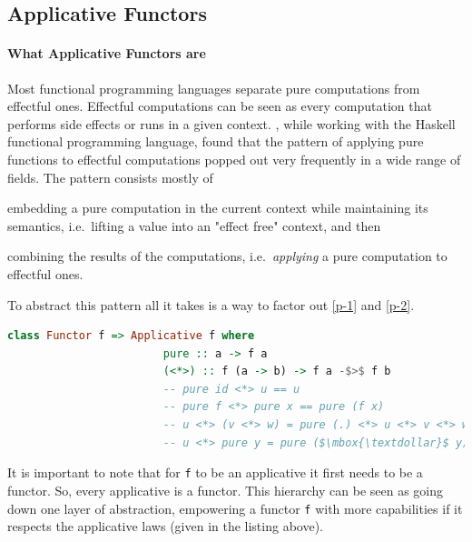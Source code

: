 \documentclass[
  oneside,
  11pt, a4paper,
  footinclude=true,
  headinclude=true,
  cleardoublepage=empty
]{scrbook}
\theoremstyle{definition}
\theoremstyle{definition}
\begin{document}
	    \subsection{Applicative Functors}
	    
	        \paragraph{What Applicative Functors are}
	        
    Most functional programming languages separate pure computations from effectful ones. Effectful computations can be seen as every computation that performs side effects or runs in a given context. \cite{mcbride2008applicative}, while working with the Haskell functional programming language, found that the pattern of applying pure functions to effectful computations popped out very frequently in a wide range of fields. The pattern consists mostly of
	    \begin{inparaenum}
            \item embedding a pure computation in the current context while maintaining its semantics, i.e.\ lifting a value into an "effect free" context,\label{p-1} and then
            \item combining the results of the computations, i.e.\ \emph{applying} a pure computation to effectful ones.\label{p-2}
        \end{inparaenum}
	To abstract this pattern all it takes is a way to factor out \ref{p-1} and \ref{p-2}.
	             
	            \begin{lstlisting}[mathescape, language=Haskell, caption={Applicative laws},captionpos=b]
	                class Functor f => Applicative f where
	                    pure :: a -> f a
	                    (<*>) :: f (a -> b) -> f a -$>$ f b
	                    -- pure id <*> u == u
	                    -- pure f <*> pure x == pure (f x)
	                    -- u <*> (v <*> w) = pure (.) <*> u <*> v <*> w
	                    -- u <*> pure y = pure ($\mbox{\textdollar}$ y) <*> u
	            \end{lstlisting}{}
	            
    It is important to note that for \texttt{f} to be an applicative it first needs to be a functor. So, every applicative is a functor. This hierarchy can be seen as going down one layer of abstraction, empowering a functor \texttt{f} with more capabilities if it respects the applicative laws (given in the listing above).
	            
\end{document}

